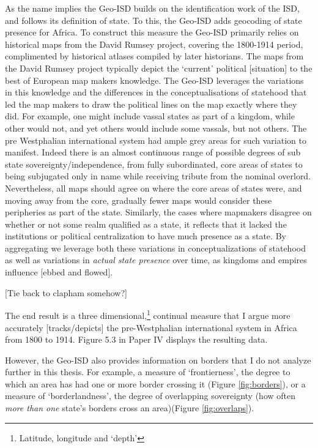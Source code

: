 As the name implies the Geo-ISD builds on the identification work of the ISD,
and follows its definition of state. To this, the Geo-ISD adds geocoding of
state presence for Africa. To construct this measure the Geo-ISD primarily
relies on historical maps from the David Rumsey project, covering the 1800-1914
period, complimented by historical atlases compiled by later historians. The
maps from the David Rumsey project typically depict the `current' political
[situation] to the best of European map makers knowledge. The Geo-ISD leverages
the variations in this knowledge and the differences in the conceptualisations
of statehood that led the map makers to draw the political lines on the map
exactly where they did. For example, one might include vassal states as part of
a kingdom, while other would not, and yet others would include some vassals, but
not others. The pre Westphalian international system had ample grey areas for
such variation to manifest. Indeed there is an almost continuous range of
possible degrees of sub state sovereignty/independence, from fully subordinated,
core areas of states to being subjugated only in name while receiving tribute
from the nominal overlord. Nevertheless, all maps should agree on where the core
areas of states were, and moving away from the core, gradually fewer maps would
consider these peripheries as part of the state. Similarly, the cases where
mapmakers disagree on whether or not some realm qualified as a state, it
reflects that it lacked the institutions or political centralization to have
much presence as a state. By aggregating we leverage both these variations in
conceptualizations of statehood as well as variations in \textit{actual state
presence} over time, as kingdoms and empires influence [ebbed and flowed].

[Tie back to clapham somehow?]

The end result is a three dimensional,\footnote{Latitude, longitude and `depth'}
continual measure that I argue more accurately [tracks/depicts] the
pre-Westphalian international system in Africa from 1800 to 1914. Figure 5.3 in
Paper IV displays the resulting data. 

However, the Geo-ISD also provides information on borders that I do not analyze
further in this thesis. For example, a measure of `frontierness', the degree to
which an area has had one or more border crossing it (Figure \ref{fig:borders}),
or a measure of `borderlandness', the degree of overlapping sovereignty (how
often \textit{more than one} state's borders cross an area)(Figure
\ref{fig:overlaps}). 


